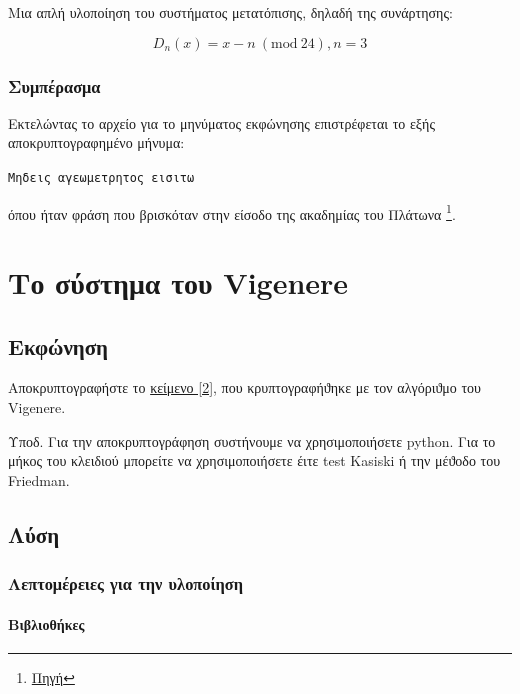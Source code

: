 \documentclass[oneside]{article}
\let\t\texttt
\newcommand{\Mod}[1]{\ (\mathrm{mod}\ #1)}
\begin{document}
Μια απλή υλοποίηση του συστήματος μετατόπισης, δηλαδή της συνάρτησης:

\begin{equation}
    D_n(x) = x - n \Mod{24}, n = 3
\end{equation}

\subsubsection{Συμπέρασμα}

Εκτελώντας το αρχείο για το μηνύματος εκφώνησης επιστρέφεται το εξής αποκρυπτογραφημένο μήνυμα:

\begin{center}
    \t{Μηδεις αγεωμετρητος εισιτω}
\end{center}

όπου ήταν φράση που βρισκόταν στην είσοδο της ακαδημίας του Πλάτωνα \footnote{\href{https://math.uoi.gr/images/pdf/mathclub/Leshi_12042016.pdf}{Πηγή}}.

\section{Το σύστημα του Vigenere}

\subsection{Εκφώνηση} 

Αποκρυπτογραφήστε το \href{https://github.com/drazioti/book_crypto/blob/master/symmetric_crypto/vigenere}{κείμενο [2]}, που κρυπτογραφήϑηκε με τον αλγόριϑμο του Vigenere.

Υποδ. Για την αποκρυπτογράφηση συστήνουμε να χρησιμοποιήσετε python. Για το μήκος του κλειδιού μπορείτε να χρησιμοποιήσετε έιτε test Kasiski ή την μέϑοδο του Friedman.

\subsection{Λύση} 

\subsubsection{Λεπτομέρειες για την υλοποίηση}

\paragraph{Βιβλιοθήκες}
\end{document}
